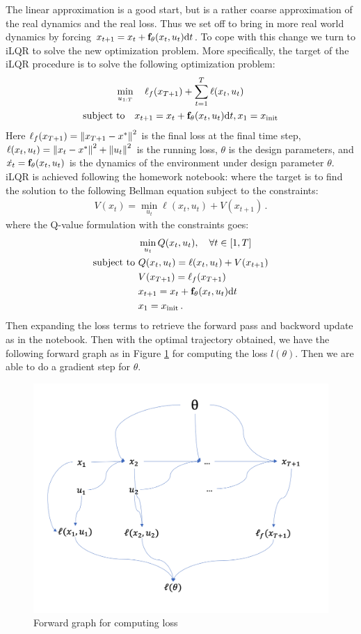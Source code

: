 \documentclass[conference]{IEEEtran}
\newcommand{\init}{\mathrm{init}}
\begin{document}
The linear approximation is a good start, but is a rather coarse approximation of the real dynamics and the real loss. Thus we set off to bring in more real world dynamics by forcing $x_{t+1} = x_t + \mathbf{f}_\theta(x_t,u_t)\textnormal{d} t$. To cope with this change we turn to iLQR to solve the new optimization problem. More specifically, the target of the iLQR procedure is to solve the following optimization problem:
\begin{gather*} 
    \min_{u_{1:T}} \quad  \ell_f(x_{T+1}) +
    \sum_{t=1}^{T} \ell(x_t,u_t) \\ 
    \text{subject to} \quad x_{t+1} = x_t + \vf_\theta(x_t,u_t)\d t,  x_1 = x_\init
\end{gather*}
Here $\ell_f(x_{T+1})  = \left\|{x_{T+1} - x^*}\right\|^2$ is the final loss at the final time step, $ \ell(x_t,u_t) = \left\|{x_{t} - x^*}\right\|^2 + \left\|{u_t}\right\|^2$ is the running loss, $\theta$ is the design parameters, and $\dot{x_t} = \mathbf{f}_\theta(x_t,u_t)$ is the dynamics of the environment under design parameter $\theta$. iLQR is achieved following the homework notebook: where the target is to find the solution to the following Bellman equation subject to the constraints:
\begin{align*}
V(x_t) = \min\limits_{u_t} \ell(x_t,u_t) + V(x_{t+1})\,.
\end{align*}
where the Q-value formulation with the constraints goes:
\begin{align*}
&\min\limits_{u_t} Q(x_t,u_t),\quad \forall t\in [1,T]\\
\text{subject to }&Q(x_t,u_t) = \ell(x_t,u_t) + V(x_{t+1})\\
&V(x_{T+1}) = \ell_f(x_{{T+1}})\\
&x_{t+1} = x_t + \vf_\theta(x_t,u_t)\d t\\
&x_1 = x_\init\,.
\end{align*}
Then expanding the loss terms to retrieve the forward pass and backword update as in the notebook. Then with the optimal trajectory obtained, we have the following forward graph as in Figure \ref{fig:phi} for computing the loss $l(\theta)$. Then we are able to do a gradient step for $\theta$.

\begin{figure}[!h]
\label{fig:phi}
\centering
\includegraphics[width=.5\textwidth]{forward_phi.png}
\caption{Forward graph for computing loss}
\end{figure}
\end{document}
